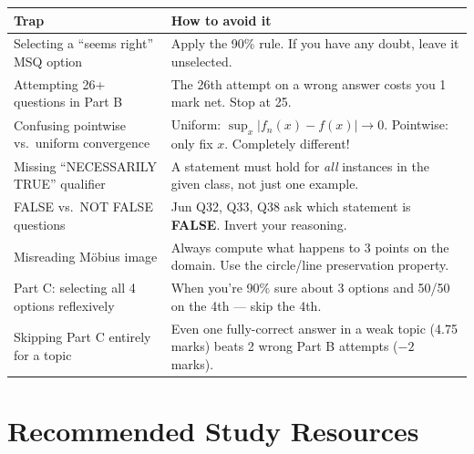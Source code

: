\documentclass[12pt,a4paper]{article}
\begin{document}
\begin{center}
\renewcommand{\arraystretch}{1.3}
\begin{tabular}{@{}p{5cm}p{9cm}@{}}
\toprule
\rowcolor{redlight}
\textbf{Trap} & \textbf{How to avoid it} \\
\midrule
Selecting a ``seems right'' MSQ option & Apply the 90\% rule. If you have any doubt, leave it unselected. \\
Attempting 26+ questions in Part B & The 26th attempt on a wrong answer costs you 1 mark net. Stop at 25. \\
Confusing pointwise vs.\ uniform convergence & Uniform: $\sup_x|f_n(x)-f(x)|\to 0$. Pointwise: only fix $x$. Completely different! \\
Missing ``NECESSARILY TRUE'' qualifier & A statement must hold for \textit{all} instances in the given class, not just one example. \\
FALSE vs.\ NOT FALSE questions & Jun Q32, Q33, Q38 ask which statement is \textbf{FALSE}. Invert your reasoning. \\
Misreading Möbius image & Always compute what happens to 3 points on the domain. Use the circle/line preservation property. \\
Part C: selecting all 4 options reflexively & When you're 90\% sure about 3 options and 50/50 on the 4th --- skip the 4th. \\
Skipping Part C entirely for a topic & Even one fully-correct answer in a weak topic (4.75 marks) beats 2 wrong Part B attempts ($-2$ marks). \\
\bottomrule
\end{tabular}
\end{center}

\newpage

\section{Recommended Study Resources}
\end{document}
